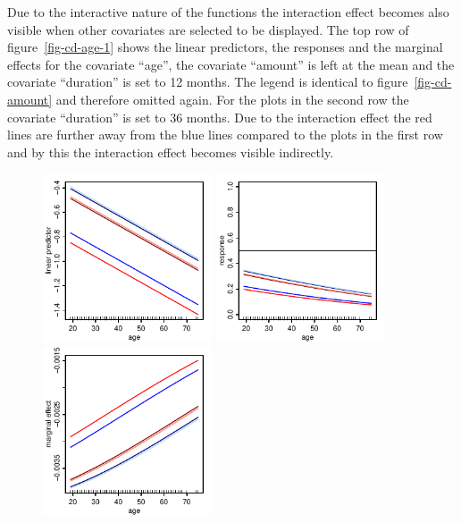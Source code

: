 \documentclass[nojss]{jss}
\newcommand{\quotes}[1]{``#1''}
\begin{document}
Due to the interactive nature of the functions the interaction effect becomes also visible when other covariates are selected to be displayed. The top row of  figure~\ref{fig-cd-age-1} shows the linear predictors, the responses and the marginal effects for the covariate \quotes{age}, the covariate  \quotes{amount} is left at the mean and the covariate \quotes{duration} is set to 12 months.  The legend is identical to figure~\ref{fig-cd-amount} and therefore omitted again. For the plots in the second row the covariate \quotes{duration} is set to 36 months. Due to the interaction effect the red lines are further away from the blue lines compared to the plots in the first row and by this the interaction effect becomes visible indirectly.

\begin{figure}[ht]
\centering
\includegraphics[width=5cm]{cd-age-link-1} \includegraphics[width=5cm]{cd-age-resp-1} \includegraphics[width=5cm]{cd-age-marg-1}


\end{figure}
\end{document}
